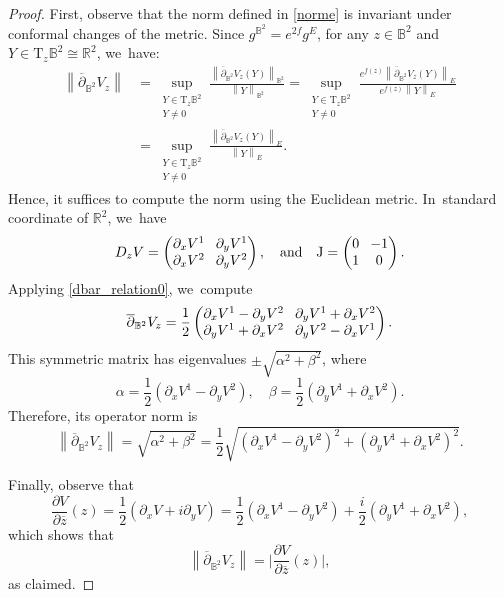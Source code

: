 \begin{proof}
First, observe that the norm defined in \eqref{norme} is invariant under conformal changes of the metric. Since \(g^{\mathbb{B}^2} = e^{2f} g^E \), for any \(z \in \mathbb{B}^2 \) and \(Y \in \mathrm{T}_z \mathbb{B}^2 \cong \mathbb{R}^2 \), we~have:
\begin{align*}
\left\lVert \overline{\partial}_{\mathbb{B}^2}V_z \right\rVert
&= \sup_{\substack{Y \in \mathrm{T}_z \mathbb{B}^2 \\ Y \neq 0}} \frac{\left\lVert \overline{\partial}_{\mathbb{B}^2}V_z(Y) \right\rVert_{\mathbb{B}^2}}{\left\lVert Y \right\rVert_{\mathbb{B}^2}} = \sup_{\substack{Y \in \mathrm{T}_z \mathbb{B}^2 \\ Y \neq 0}} \frac{e^{f(z)} \left\lVert \overline{\partial}_{\mathbb{B}^2}V_z(Y) \right\rVert_E}{e^{f(z)} \left\lVert Y \right\rVert_E} \\
&= \sup_{\substack{Y \in \mathrm{T}_z \mathbb{B}^2 \\ Y \neq 0}} \frac{ \left\lVert\overline{\partial}_{\mathbb{B}^2}V_z(Y) \right\rVert_E}{\left \lVert Y \right\rVert_E}.
\end{align*}
Hence, it suffices to compute the norm using the Euclidean metric. In~standard coordinate of $\mathbb{R}^2$, we~have
\[\arraycolsep4pt
D_z V =
\begin{pmatrix}
\partial_x V^1 & \partial_y V^1 \\
\partial_x V^2 & \partial_y V^2
\end{pmatrix},
\quad
\text{and} \quad
\mathrm{J} =
\begin{pmatrix}
0 & -1 \\
1 & 0
\end{pmatrix}.
\]
Applying \eqref{dbar_relation0}, we~compute
\[\arraycolsep4pt
\overline{\partial}_{\mathbb{B}^2}V_z
=
\frac{1}{2}
\begin{pmatrix}
\partial_x V^1 - \partial_y V^2 & \partial_y V^1 + \partial_x V^2 \\
\partial_y V^1 + \partial_x V^2 & \partial_y V^2 - \partial_x V^1
\end{pmatrix}.
\]
This symmetric matrix has eigenvalues \(\pm \sqrt{\alpha^2 + \beta^2} \), where
\[
\alpha = \frac{1}{2}(\partial_x V^1 - \partial_y V^2), \quad
\beta = \frac{1}{2}(\partial_y V^1 + \partial_x V^2).
\]
Therefore, its operator norm is
\[
\left\lVert \overline{\partial}_{\mathbb{B}^2}V_z \right\rVert
= \sqrt{\alpha^2 + \beta^2}
= \frac{1}{2} \sqrt{(\partial_x V^1 - \partial_y V^2)^2 + (\partial_y V^1 + \partial_x V^2)^2}.
\]

Finally, observe that
\[
\frac{\partial V}{\partial \overline{z}}(z)
= \frac{1}{2} \left(\partial_x V + i \partial_y V \right)
= \frac{1}{2} \left(\partial_x V^1 - \partial_y V^2 \right) + \frac{i}{2}(\partial_y V^1 + \partial_x V^2),
\]
which shows that
\[
\left\lVert \overline{\partial}_{\mathbb{B}^2} V_z \right\rVert = \biggl| \frac{\partial V}{\partial \overline{z}}(z) \biggr|,
\]
as claimed.
\end{proof}

